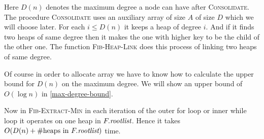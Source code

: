 Here $D(n)$ denotes the maximum degree a node can have after \textsc{Consolidate}. The procedure \textsc{Consolidate} uses an auxiliary array of size $A$ of size $D$ which we will choose later. For each $i\leq D(n)$ it keeps a heap of degree $i$. And if it finds two heaps of same degree then it makes the one with higher key to be the child of the other one. The function \textsc{Fib-Heap-Link} does this process of linking two heaps of same degree.\parinn

Of course in order to allocate array we have to know how to calculate the upper bound for $D(n)$ on the maximum degree. We will show an upper bound of $O(\log n)$ in \autoref{max-degree-bound}.

Now in \textsc{Fib-Extract-Min} in each iteration of the outer for loop or inner while loop it operates on one heap in $F.\emph{rootlist}$. Hence it takes $O(D(n)+\#\text{heaps in $F.\emph{rootlist}$})$ time.


